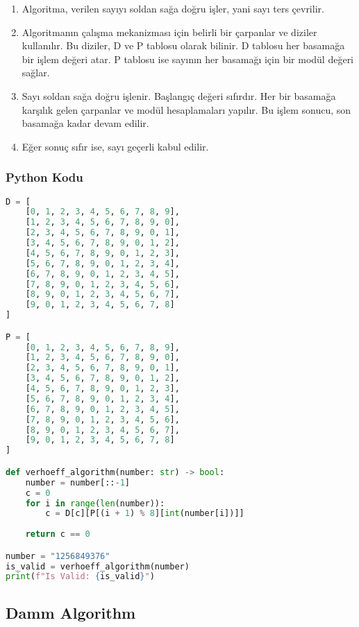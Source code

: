 \begin{enumerate}
    \item Algoritma, verilen sayıyı soldan sağa doğru işler, yani sayı ters çevrilir.
    \item Algoritmanın çalışma mekanizması için belirli bir çarpanlar ve diziler kullanılır. Bu diziler, D ve P tablosu olarak bilinir. D tablosu her basamağa bir işlem değeri atar. P tablosu ise sayının her basamağı için bir modül değeri sağlar.
    \item Sayı soldan sağa doğru işlenir. Başlangıç değeri sıfırdır. Her bir basamağa karşılık gelen çarpanlar ve modül hesaplamaları yapılır. Bu işlem sonucu, son basamağa kadar devam edilir.
    \item Eğer sonuç sıfır ise, sayı geçerli kabul edilir.
\end{enumerate}

\subsubsection{Python Kodu}

\begin{lstlisting}[language=Python]
D = [
    [0, 1, 2, 3, 4, 5, 6, 7, 8, 9],
    [1, 2, 3, 4, 5, 6, 7, 8, 9, 0],
    [2, 3, 4, 5, 6, 7, 8, 9, 0, 1],
    [3, 4, 5, 6, 7, 8, 9, 0, 1, 2],
    [4, 5, 6, 7, 8, 9, 0, 1, 2, 3],
    [5, 6, 7, 8, 9, 0, 1, 2, 3, 4],
    [6, 7, 8, 9, 0, 1, 2, 3, 4, 5],
    [7, 8, 9, 0, 1, 2, 3, 4, 5, 6],
    [8, 9, 0, 1, 2, 3, 4, 5, 6, 7],
    [9, 0, 1, 2, 3, 4, 5, 6, 7, 8]
]

P = [
    [0, 1, 2, 3, 4, 5, 6, 7, 8, 9],
    [1, 2, 3, 4, 5, 6, 7, 8, 9, 0],
    [2, 3, 4, 5, 6, 7, 8, 9, 0, 1],
    [3, 4, 5, 6, 7, 8, 9, 0, 1, 2],
    [4, 5, 6, 7, 8, 9, 0, 1, 2, 3],
    [5, 6, 7, 8, 9, 0, 1, 2, 3, 4],
    [6, 7, 8, 9, 0, 1, 2, 3, 4, 5],
    [7, 8, 9, 0, 1, 2, 3, 4, 5, 6],
    [8, 9, 0, 1, 2, 3, 4, 5, 6, 7],
    [9, 0, 1, 2, 3, 4, 5, 6, 7, 8]
]

def verhoeff_algorithm(number: str) -> bool:
    number = number[::-1]
    c = 0
    for i in range(len(number)):
        c = D[c][P[(i + 1) % 8][int(number[i])]]
    
    return c == 0

number = "1256849376"
is_valid = verhoeff_algorithm(number)
print(f"Is Valid: {is_valid}")
\end{lstlisting}

\newpage

\subsection{Damm Algorithm}

